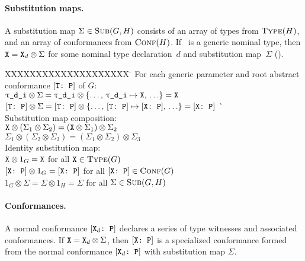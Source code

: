 \documentclass[../generics]{subfiles}
\begin{document}
\paragraph{Substitution maps.} A substitution map $\Sigma\in\textsc{Sub}({G, H})$ consists of an array of types from $\textsc{Type}({H})$, and an array of conformances from $\textsc{Conf}({H})$. If \tX\ is a generic nominal type, then $\texttt{X}=\texttt{X}_d\otimes\Sigma$ for some nominal type declaration~$d$ and substitution map~$\Sigma$ ().

\begin{tabbing}
XXXXXXXXXXXXXXXXXXXX \= \kill
For each generic parameter  and root abstract conformance $[\texttt{T:~P}]$ of $G$:\\
\qquad $\ttgp{d}{i} \otimes \Sigma = \ttgp{d}{i} \otimes\SubstMap{\ldots,\,\SubstType{\ttgp{d}{i}}{X},\,\ldots} = \tX$\\
\qquad $[\texttt{T:~P}] \otimes \Sigma = [\texttt{T:~P}] \otimes \{\ldots,\,[\texttt{T:~P}] \mapsto [\texttt{X:~P}],\,\ldots\} = [\texttt{X:~P}]$ \` \\[\medskipamount]
Substitution map composition:\\
\qquad $\texttt{X} \otimes (\Sigma_1 \otimes \Sigma_2) = (\texttt{X} \otimes \Sigma_1) \otimes \Sigma_2$ \\
\qquad $\Sigma_1 \otimes (\Sigma_2 \otimes \Sigma_3) = (\Sigma_1 \otimes \Sigma_2) \otimes \Sigma_3$\\[\medskipamount]
Identity substitution map:\\
\qquad $\texttt{X} \otimes 1_G = \texttt{X}$ \> for all $\texttt{X}\in\textsc{Type}({G})$\\
\qquad $[\texttt{X:~P}] \otimes 1_G = [\texttt{X:~P}]$ \> for all $[\texttt{X:~P}]\in\textsc{Conf}({G})$\\
\qquad $1_G \otimes \Sigma = \Sigma \otimes 1_H = \Sigma$ \> for all $\Sigma\in\textsc{Sub}({G, H})$
\end{tabbing}

\paragraph{Conformances.} A normal conformance $[\texttt{$\texttt{X}_d$:~P}]$ declares a series of type witnesses and associated conformances. If $\texttt{X}=\texttt{X}_d\otimes\Sigma$, then $[\texttt{X:~P}]$ is a specialized conformance formed from the normal conformance $[\texttt{$\texttt{X}_d$:~P}]$ with substitution map $\Sigma$.
\end{document}
